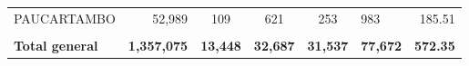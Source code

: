 \begin{tabular}{lrccclr}
	\cellcolor[HTML]{C6E0B4}PAUCARTAMBO                            & 52,989                                                         & 109                                                         & 621                  & 253                      & 983                                                                 & 185.51                                                                       \\
	& \multicolumn{1}{l}{}                                           & \multicolumn{1}{l}{}                                        & \multicolumn{1}{l}{} & \multicolumn{1}{l}{}     &                                                                     & \multicolumn{1}{l}{}                                                         \\
	\rowcolor[HTML]{DDEBF7} 
	\textbf{Total   general}                                       & \textbf{1,357,075}                                             & \multicolumn{1}{r}{\cellcolor[HTML]{DDEBF7}\textbf{13,448}} & \textbf{32,687}      & \textbf{31,537}          & \textbf{77,672}                                                     & \textbf{572.35}                                                             
\end{tabular}
